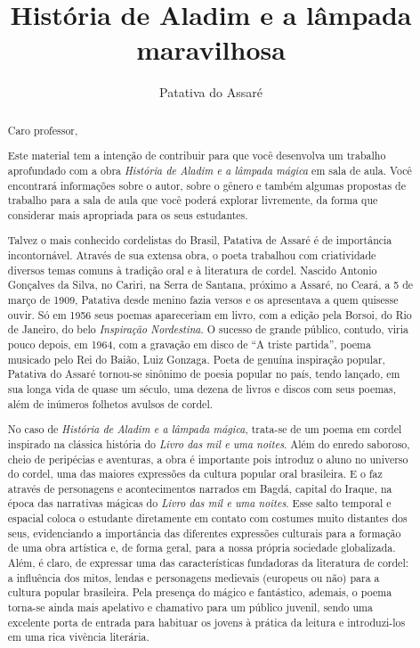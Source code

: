 \documentclass[11pt]{extarticle}
\newcommand{\AutorLivro}{Patativa do Assaré}
\newcommand{\TituloLivro}{História de Aladim e a lâmpada maravilhosa}
\newcommand{\colaborador}{Paulo Pompermaier}
\begin{document}
\title{\TituloLivro}
\author{\AutorLivro}
\def\authornotes{\colaborador}

\date{}
\maketitle

\tableofcontents


\begin{abstract}

Caro professor,

Este material tem a intenção de contribuir para que você desenvolva um trabalho aprofundado com a obra \textit{História de Aladim e a lâmpada mágica} em sala de aula.
Você encontrará informações sobre o autor, sobre o gênero e também 
algumas propostas de trabalho para a sala de aula que você poderá explorar livremente, 
da forma que considerar mais apropriada para os seus estudantes.

Talvez o mais conhecido cordelistas do Brasil, Patativa de Assaré é de importância incontornável. Através de sua extensa obra, o poeta trabalhou com criatividade diversos temas comuns à tradição oral e à literatura de cordel.
Nascido Antonio Gonçalves da Silva, no Cariri, na Serra de Santana, próximo a Assaré,
no Ceará, a 5 de março de 1909, Patativa 
desde menino fazia versos e os apresentava a
quem quisesse ouvir. Só em 1956 seus poemas apareceriam em livro, com a edição
pela Borsoi, do Rio de Janeiro, do belo \textit{Inspiração Nordestina}. O
sucesso de grande público, contudo, viria pouco depois, em 1964, com a gravação
em disco de ``A triste partida'', poema musicado pelo Rei do Baião, Luiz
Gonzaga. Poeta de genuína inspiração popular, Patativa do Assaré tornou-se
sinônimo de poesia popular no país, tendo lançado, em sua longa vida de quase
um século, uma dezena de livros e discos com seus poemas, além de inúmeros
folhetos avulsos de cordel. 

No caso de \textit{História de Aladim e a lâmpada mágica}, trata-se de um poema em cordel inspirado na clássica história do \textit{Livro das mil e uma noites}.
Além do enredo saboroso, cheio de peripécias e aventuras, a obra é importante pois introduz o aluno no universo do cordel, uma das maiores expressões da cultura popular oral brasileira. E o faz através de personagens e acontecimentos narrados em Bagdá, capital do Iraque, na época das narrativas mágicas do \textit{Livro das mil e uma noites}. Esse salto temporal e espacial coloca o estudante diretamente em contato com costumes muito distantes dos seus, evidenciando a importância das diferentes expressões culturais para a formação de uma obra artística e, de forma geral, para a nossa própria sociedade globalizada. Além, é claro, de expressar uma das características fundadoras da literatura de cordel: a influência dos mitos, lendas e personagens medievais (europeus ou não) para a cultura popular brasileira. 
Pela presença do mágico e fantástico, ademais, o poema torna-se ainda mais apelativo e chamativo para um público juvenil, sendo uma excelente porta de entrada para habituar os jovens à prática da leitura e introduzi-los em uma rica vivência literária.


\end{abstract}
\end{document}
